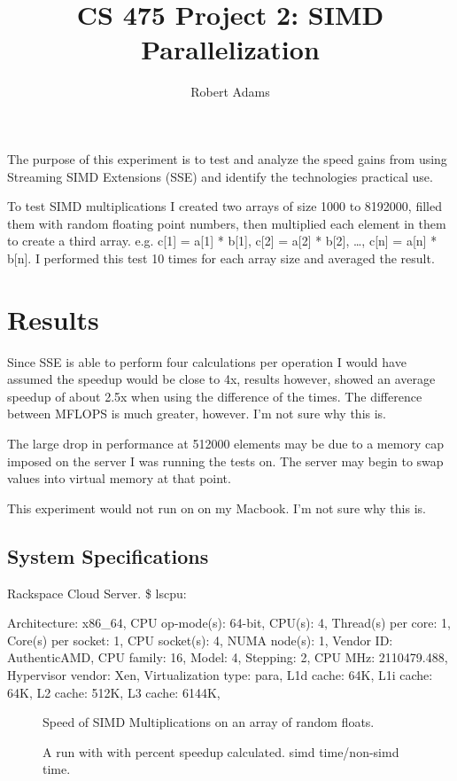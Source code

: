 \documentclass[letterpaper,10pt]{article} %
\begin{document}
\title{CS 475 Project 2: SIMD Parallelization } 
\author{Robert Adams}
\maketitle


The purpose of this experiment is to test and analyze the speed
gains from using Streaming SIMD Extensions (SSE) and identify
the technologies practical use.


To test SIMD multiplications I created two arrays of size 1000 to 8192000, 
filled them with random floating point numbers, then multiplied each element
in them to create a third array. e.g.
c[1] = a[1] * b[1], c[2] = a[2] * b[2], …, c[n] = a[n] * b[n].
I performed this test 10 times for each array size and averaged the result.


\section{Results}



Since SSE is able to perform four calculations per operation I would have assumed the speedup would be close to 4x, results however, showed an 
average speedup of about 2.5x when using the difference of the times. 
The difference between MFLOPS is much greater, however. I’m not sure why this is.


The large drop in performance at 512000 elements may be due to a memory cap 
imposed on the server I was running the tests on. The server may begin 
to swap values into virtual memory at that point. 


This experiment would not run on on my Macbook. I’m not sure why this is.


\subsection{System Specifications}

Rackspace Cloud Server. \$ lscpu:

Architecture:          x86\_64,
CPU op-mode(s):        64-bit,
CPU(s):                4,
Thread(s) per core:    1,
Core(s) per socket:    1,
CPU socket(s):         4,
NUMA node(s):          1,
Vendor ID:             AuthenticAMD,
CPU family:            16,
Model:                 4,
Stepping:              2,
CPU MHz:               2110479.488,
Hypervisor vendor:     Xen,
Virtualization type:   para,
L1d cache:             64K,
L1i cache:             64K,
L2 cache:              512K,
L3 cache:              6144K,


\begin{figure} [ht]
    \centering
    
    \caption{Speed of SIMD Multiplications on an array of random floats.}
    \label{runtimes}
\end{figure}

\begin{figure} [ht]
    \centering
    
    \caption{A run with with percent speedup calculated. simd time/non-simd time.}
    \label{runtimes}
\end{figure}
\end{document}
